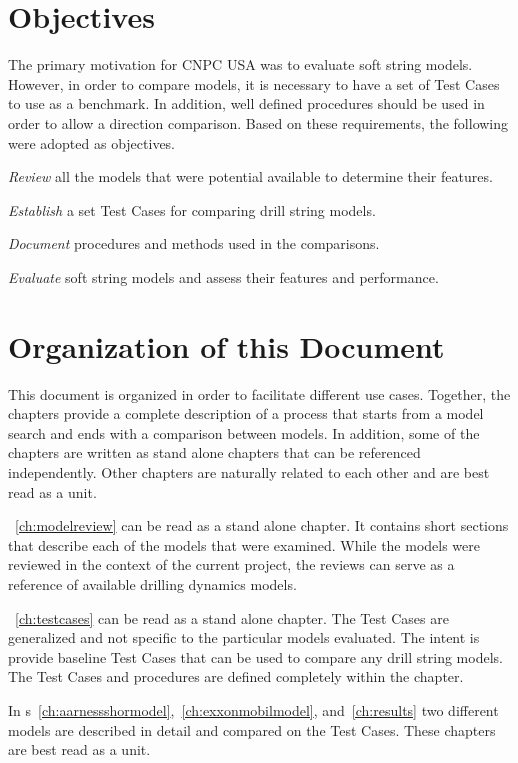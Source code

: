 \section{Objectives}
The primary motivation for CNPC USA was to evaluate soft string models.  However, in order to compare models, it is necessary to have a set of Test Cases to use as a benchmark.  In addition, well defined procedures should be used in order to allow a direction comparison.  Based on these requirements, the following were adopted as objectives.
\begin{numberedlist}
	\item \emph{Review} all the models that were potential available to determine their features.
	\item \emph{Establish} a set Test Cases for comparing drill string models.
	\item \emph{Document} procedures and methods used in the comparisons.
	\item \emph{Evaluate} soft string models and assess their features and performance.
\end{numberedlist}

\section{Organization of this Document}
This document is organized in order to facilitate different use cases.  Together, the chapters provide a complete description of a process that starts from a model search and ends with a comparison between models.  In addition, some of the chapters are written as stand alone chapters that can be referenced independently.  Other chapters are naturally related to each other and are best read as a unit.

\chaptername~\ref{ch:modelreview} can be read as a stand alone chapter.  It contains short sections that describe each of the models that were examined.  While the models were reviewed in the context of the current project, the reviews can serve as a reference of available drilling dynamics models.

\chaptername~\ref{ch:testcases} can be read as a stand alone chapter.  The Test Cases are generalized and not specific to the particular models evaluated.  The intent is provide baseline Test Cases that can be used to compare any drill string models.  The Test Cases and procedures are defined completely within the chapter.

In \chaptername{}s~\ref{ch:aarnessshormodel},~\ref{ch:exxonmobilmodel}, and~\ref{ch:results} two different models are described in detail and compared on the Test Cases.  These chapters are best read as a unit.

